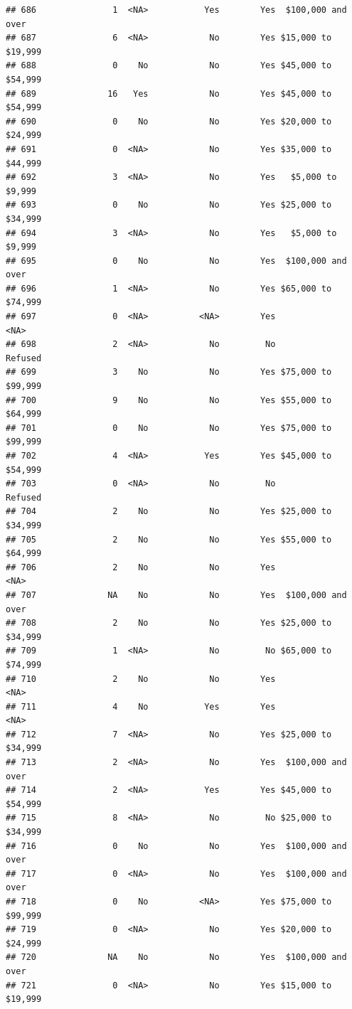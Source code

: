 \documentclass[man]{apa6}
\begin{document}
\begin{verbatim}
## 686               1  <NA>           Yes        Yes  $100,000 and over
## 687               6  <NA>            No        Yes $15,000 to $19,999
## 688               0    No            No        Yes $45,000 to $54,999
## 689              16   Yes            No        Yes $45,000 to $54,999
## 690               0    No            No        Yes $20,000 to $24,999
## 691               0  <NA>            No        Yes $35,000 to $44,999
## 692               3  <NA>            No        Yes   $5,000 to $9,999
## 693               0    No            No        Yes $25,000 to $34,999
## 694               3  <NA>            No        Yes   $5,000 to $9,999
## 695               0    No            No        Yes  $100,000 and over
## 696               1  <NA>            No        Yes $65,000 to $74,999
## 697               0  <NA>          <NA>        Yes               <NA>
## 698               2  <NA>            No         No            Refused
## 699               3    No            No        Yes $75,000 to $99,999
## 700               9    No            No        Yes $55,000 to $64,999
## 701               0    No            No        Yes $75,000 to $99,999
## 702               4  <NA>           Yes        Yes $45,000 to $54,999
## 703               0  <NA>            No         No            Refused
## 704               2    No            No        Yes $25,000 to $34,999
## 705               2    No            No        Yes $55,000 to $64,999
## 706               2    No            No        Yes               <NA>
## 707              NA    No            No        Yes  $100,000 and over
## 708               2    No            No        Yes $25,000 to $34,999
## 709               1  <NA>            No         No $65,000 to $74,999
## 710               2    No            No        Yes               <NA>
## 711               4    No           Yes        Yes               <NA>
## 712               7  <NA>            No        Yes $25,000 to $34,999
## 713               2  <NA>            No        Yes  $100,000 and over
## 714               2  <NA>           Yes        Yes $45,000 to $54,999
## 715               8  <NA>            No         No $25,000 to $34,999
## 716               0    No            No        Yes  $100,000 and over
## 717               0  <NA>            No        Yes  $100,000 and over
## 718               0    No          <NA>        Yes $75,000 to $99,999
## 719               0  <NA>            No        Yes $20,000 to $24,999
## 720              NA    No            No        Yes  $100,000 and over
## 721               0  <NA>            No        Yes $15,000 to $19,999

\end{verbatim}
\end{document}
